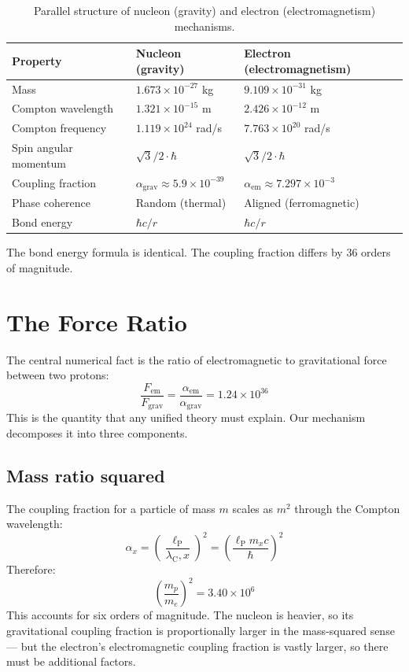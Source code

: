 \documentclass[11pt,letterpaper]{article}
\newcommand{\lambdac}{\lambda_{\mathrm{C}}}
\begin{document}
\begin{table}[H]
  \centering
  \caption{Parallel structure of nucleon (gravity) and electron (electromagnetism) mechanisms.}
  \label{tab:parallel}
  \begin{tabular}{lll}
    \toprule
    Property & Nucleon (gravity) & Electron (electromagnetism) \\
    \midrule
    Mass & $1.673 \times 10^{-27}$ kg & $9.109 \times 10^{-31}$ kg \\
    Compton wavelength & $1.321 \times 10^{-15}$ m & $2.426 \times 10^{-12}$ m \\
    Compton frequency & $1.119 \times 10^{24}$ rad/s & $7.763 \times 10^{20}$ rad/s \\
    Spin angular momentum & $\sqrt{3}/2 \cdot \hbar$ & $\sqrt{3}/2 \cdot \hbar$ \\
    Coupling fraction & $\alpha_{\mathrm{grav}} \approx 5.9 \times 10^{-39}$ & $\alpha_{\mathrm{em}} \approx 7.297 \times 10^{-3}$ \\
    Phase coherence & Random (thermal) & Aligned (ferromagnetic) \\
    Bond energy & $\hbar c/r$ & $\hbar c/r$ \\
    \bottomrule
  \end{tabular}
\end{table}

The bond energy formula is identical. The coupling fraction differs by 36 orders of
magnitude.

\section{The Force Ratio}

The central numerical fact is the ratio of electromagnetic to gravitational force
between two protons:
\begin{equation}
  \frac{F_{\mathrm{em}}}{F_{\mathrm{grav}}}
  = \frac{\alpha_{\mathrm{em}}}{\alpha_{\mathrm{grav}}}
  = 1.24 \times 10^{36}
  \label{eq:force_ratio}
\end{equation}
This is the quantity that any unified theory must explain. Our mechanism
decomposes it into three components.

\subsection{Mass ratio squared}

The coupling fraction for a particle of mass $m$ scales as $m^2$ through the
Compton wavelength:
\begin{equation}
  \alpha_x = \left(\frac{\ell_{\mathrm{P}}}{\lambdac,x}\right)^2
  = \left(\frac{\ell_{\mathrm{P}} m_x c}{\hbar}\right)^2
  \label{eq:alpha_mass}
\end{equation}
Therefore:
\begin{equation}
  \left(\frac{m_p}{m_e}\right)^2 = 3.40 \times 10^6
  \label{eq:mass_ratio}
\end{equation}
This accounts for six orders of magnitude. The nucleon is heavier, so its
gravitational coupling fraction is proportionally larger in the mass-squared sense ---
but the electron's electromagnetic coupling fraction is vastly larger, so there must
be additional factors.
\end{document}
